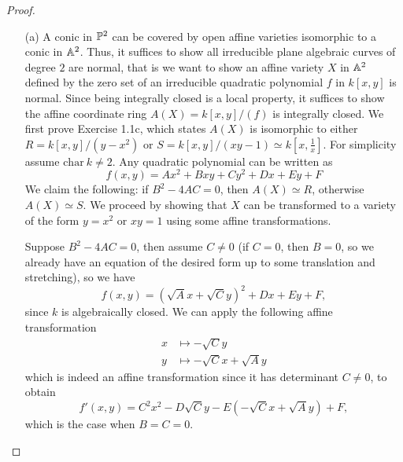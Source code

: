 \documentclass{article}
\begin{document}
\begin{enumerate} [label=\textbf{\arabic*.}, leftmargin=-0.05em]
\begin{proof} $ $ \vspace{0pt}
   \begin{itemize} [leftmargin=0cm]
    \item[(a)] A conic in $\mathbb{P}^2$ can be covered by open affine varieties isomorphic to a conic in $\mathbb{A}^2$. Thus, it suffices to show all irreducible plane algebraic curves of degree $2$ are normal, that is we want to show an affine variety $X$ in $\mathbb{A}^2$ defined by the zero set of an irreducible quadratic polynomial $f$ in $k[x, y]$ is normal. Since being integrally closed is a local property, it suffices to show the affine coordinate ring $A(X) = k[x, y] / (f)$ is integrally closed. We first prove Exercise 1.1c, which states $A(X)$ is isomorphic to either $R = k[x, y] / (y - x^2)$ or $S = k[x, y] / (xy - 1) \simeq k[x, \frac{1}{x}]$. For simplicity assume $\text{char}~k \neq 2$. Any quadratic polynomial can be written as
    \begin{equation*}
        f(x, y)  = Ax^2 + Bxy + Cy^2 + Dx + Ey + F
    \end{equation*}
    We claim the following: if $B^2 - 4AC = 0$, then $A(X) \simeq R$, otherwise $A(X) \simeq S$. We proceed by showing that $X$ can be transformed to a variety of the form $y = x^2$ or $xy = 1$ using some affine transformations.

    Suppose $B^2 - 4AC = 0$, then assume $C \neq 0$ (if $C = 0$, then $B = 0$, so we already have an equation of the desired form up to some translation and stretching), so we have
    \begin{equation*}
        f(x, y) = (\sqrt{A}x + \sqrt{C}y)^2 + Dx + Ey + F,
    \end{equation*}
    since $k$ is algebraically closed. We can apply the following affine transformation
    \begin{align*}
        x & \mapsto -\sqrt{C} y\\
        y & \mapsto -\sqrt{C} x + \sqrt{A}y
    \end{align*}
    which is indeed an affine transformation since it has determinant $C \neq 0$, to obtain
    \begin{equation*}
        f'(x, y) = C^2 x^2 - D\sqrt{C}y - E(-\sqrt{C}x + \sqrt{A}y) + F,
    \end{equation*}
    which is the case when $B = C = 0$. 


\end{itemize}
\end{proof}
\end{enumerate}
\end{document}
